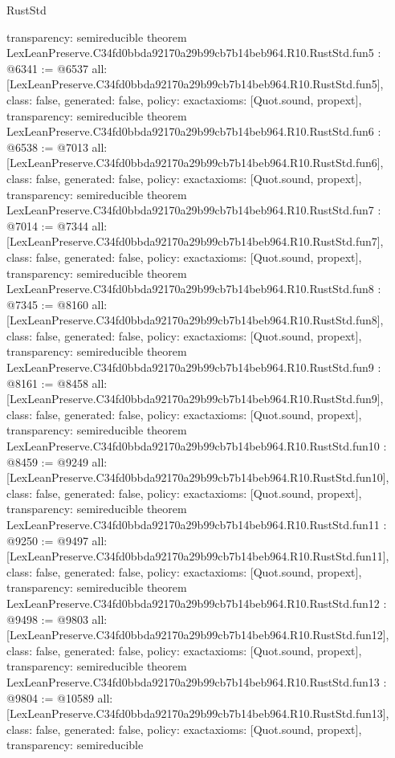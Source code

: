 \begin{lexlean}{RustStd}
\begin{coremodule}
{  transparency: semireducible
}
theorem LexLeanPreserve.C34fd0bbda92170a29b99cb7b14beb964.R10.RustStd.fun5 : @6341 := @6537 {
  all: [LexLeanPreserve.C34fd0bbda92170a29b99cb7b14beb964.R10.RustStd.fun5],
  class: false,
  generated: false,
  policy: exact{axioms: [Quot.sound, propext]},
  transparency: semireducible
}
theorem LexLeanPreserve.C34fd0bbda92170a29b99cb7b14beb964.R10.RustStd.fun6 : @6538 := @7013 {
  all: [LexLeanPreserve.C34fd0bbda92170a29b99cb7b14beb964.R10.RustStd.fun6],
  class: false,
  generated: false,
  policy: exact{axioms: [Quot.sound, propext]},
  transparency: semireducible
}
theorem LexLeanPreserve.C34fd0bbda92170a29b99cb7b14beb964.R10.RustStd.fun7 : @7014 := @7344 {
  all: [LexLeanPreserve.C34fd0bbda92170a29b99cb7b14beb964.R10.RustStd.fun7],
  class: false,
  generated: false,
  policy: exact{axioms: [Quot.sound, propext]},
  transparency: semireducible
}
theorem LexLeanPreserve.C34fd0bbda92170a29b99cb7b14beb964.R10.RustStd.fun8 : @7345 := @8160 {
  all: [LexLeanPreserve.C34fd0bbda92170a29b99cb7b14beb964.R10.RustStd.fun8],
  class: false,
  generated: false,
  policy: exact{axioms: [Quot.sound, propext]},
  transparency: semireducible
}
theorem LexLeanPreserve.C34fd0bbda92170a29b99cb7b14beb964.R10.RustStd.fun9 : @8161 := @8458 {
  all: [LexLeanPreserve.C34fd0bbda92170a29b99cb7b14beb964.R10.RustStd.fun9],
  class: false,
  generated: false,
  policy: exact{axioms: [Quot.sound, propext]},
  transparency: semireducible
}
theorem LexLeanPreserve.C34fd0bbda92170a29b99cb7b14beb964.R10.RustStd.fun10 : @8459 := @9249 {
  all: [LexLeanPreserve.C34fd0bbda92170a29b99cb7b14beb964.R10.RustStd.fun10],
  class: false,
  generated: false,
  policy: exact{axioms: [Quot.sound, propext]},
  transparency: semireducible
}
theorem LexLeanPreserve.C34fd0bbda92170a29b99cb7b14beb964.R10.RustStd.fun11 : @9250 := @9497 {
  all: [LexLeanPreserve.C34fd0bbda92170a29b99cb7b14beb964.R10.RustStd.fun11],
  class: false,
  generated: false,
  policy: exact{axioms: [Quot.sound, propext]},
  transparency: semireducible
}
theorem LexLeanPreserve.C34fd0bbda92170a29b99cb7b14beb964.R10.RustStd.fun12 : @9498 := @9803 {
  all: [LexLeanPreserve.C34fd0bbda92170a29b99cb7b14beb964.R10.RustStd.fun12],
  class: false,
  generated: false,
  policy: exact{axioms: [Quot.sound, propext]},
  transparency: semireducible
}
theorem LexLeanPreserve.C34fd0bbda92170a29b99cb7b14beb964.R10.RustStd.fun13 : @9804 := @10589 {
  all: [LexLeanPreserve.C34fd0bbda92170a29b99cb7b14beb964.R10.RustStd.fun13],
  class: false,
  generated: false,
  policy: exact{axioms: [Quot.sound, propext]},
  transparency: semireducible
}
\end{coremodule}
\end{lexlean}
